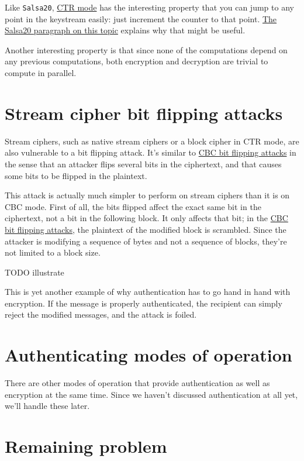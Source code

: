 \documentclass[11pt,ebook,table,dvipsnames]{memoir}
\begin{document}
Like \texttt{Salsa20}, \hyperref[CTR-mode]{CTR mode} has the interesting property that you can jump
to any point in the keystream easily: just increment the counter to
that point. \hyperref[keystream-jump]{The Salsa20 paragraph on this topic} explains why that
might be useful.

Another interesting property is that since none of the computations
depend on any previous computations, both encryption and decryption
are trivial to compute in parallel.
\section{Stream cipher bit flipping attacks}
\label{sec-2-3-13}

Stream ciphers, such as native stream ciphers or a block cipher in
\gls{CTR mode}, are also vulnerable to a bit flipping attack. It's
similar to \hyperref[CBC-bit-flipping-attacks]{CBC bit flipping attacks} in the sense that an attacker
flips several bits in the ciphertext, and that causes some bits to be
flipped in the plaintext.

This attack is actually much simpler to perform on stream ciphers than
it is on \gls{CBC mode}. First of all, the bits flipped affect the
exact same bit in the ciphertext, not a bit in the following block. It
only affects that bit; in the \hyperref[CBC-bit-flipping-attacks]{CBC bit flipping attacks}, the plaintext
of the modified block is scrambled. Since the attacker is modifying a
sequence of bytes and not a sequence of blocks, they're not limited to
a block size.

TODO illustrate

This is yet another example of why authentication has to go hand in
hand with encryption. If the message is properly authenticated, the
recipient can simply reject the modified messages, and the attack is
foiled.
\section{Authenticating modes of operation}
\label{sec-2-3-14}

There are other modes of operation that provide authentication as
well as encryption at the same time. Since we haven't discussed
authentication at all yet, we'll handle these later.
\section{Remaining problem}
\label{sec-2-3-15}
\end{document}
